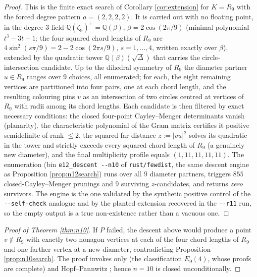 \documentclass[11pt]{article}
\theoremstyle{definition}
\theoremstyle{remark}
\newcommand{\Q}{\mathbb{Q}}
\begin{document}
\begin{proof}
This is the finite exact search of Corollary \ref{cor:extension} for $K = R_9$ with the
forced degree pattern $a = (2,2,2,2)$. It is carried out with no floating point, in the
degree-$3$ field $\Q(\zeta_9)^+ = \Q(\beta)$, $\beta = 2\cos(2\pi/9)$ (minimal polynomial
$t^3 - 3t + 1$; the four squared chord lengths of $R_9$ are
$4\sin^2(s\pi/9) = 2 - 2\cos(2\pi s/9)$, $s = 1, \dots, 4$, written exactly over $\beta$),
extended by the quadratic tower $\Q(\beta)(\sqrt{\Delta})$ that carries the
circle-intersection candidate. Up to the dihedral symmetry of $R_9$ the diameter partner
$u \in R_9$ ranges over $9$ choices, all enumerated; for each, the eight remaining vertices
are partitioned into four pairs, one at each chord length, and the resulting colouring pins
$v$ as an intersection of two circles centred at vertices of $R_9$ with radii among its
chord lengths. Each candidate is then filtered by exact necessary conditions: the closed
four-point Cayley--Menger determinants vanish (planarity), the characteristic polynomial of
the Gram matrix certifies it positive semidefinite of rank $\le 2$, the squared far
distance $z := |vu|^2$ solves its quadratic in the tower and strictly exceeds every squared
chord length of $R_9$ (a genuinely new diameter), and the final multiplicity profile equals
$(1,11,11,11,11)$. The enumeration (bin \texttt{e12\_descent
-{}-n10} of \texttt{rust/fewdist}, the same descent engine as Proposition
\ref{prop:n12search}) runs over all $9$ diameter partners, triggers $855$
closed-Cayley--Menger prunings and $9$ surviving $z$-candidates, and returns \emph{zero}
survivors. The engine is the one validated by the synthetic positive control of the
\texttt{-{}-self-check} analogue and by the planted extension recovered in the
\texttt{-{}-r11} run, so the empty output is a true non-existence rather than a vacuous one.
\end{proof}

\begin{proof}[Proof of Theorem \ref{thm:n10}]
If $P$ failed, the descent above would produce a point $v \notin R_9$ with exactly two
nonagon vertices at each of the four chord lengths of $R_9$ and one farther vertex at a new
diameter, contradicting Proposition \ref{prop:n10search}. The proof invokes only
\cite[Theorem~1]{ErFi96} (the classification $E_9(4)$, whose proofs are complete) and
Hopf--Pannwitz \cite{HoPa34}; hence $n = 10$ is closed unconditionally.
\end{proof}
\end{document}
